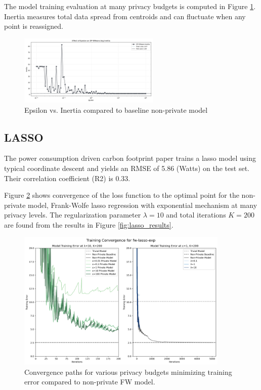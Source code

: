 \documentclass[12pt,letterpaper]{article}
\begin{document}
The model training evaluation at many privacy budgets is computed in Figure \ref{fig:epsilon_inertia}. Inertia measures total data spread from centroids and can fluctuate when any point is reassigned.

\begin{figure}[H]
    \centering
    \includegraphics[width=0.6\textwidth]{figure/dpk_plot.png}
    \caption{Epsilon vs. Inertia compared to baseline non-private model}
    \label{fig:epsilon_inertia}
\end{figure}

\subsection{LASSO}

The power consumption driven carbon footprint paper trains a lasso model using typical coordinate descent and yields an RMSE of 5.86 (Watts) on the test set. Their correlation coefficient (R2) is 0.33.

Figure \ref{fig:lasso_convergence} shows convergence of the loss function to the optimal point for the non-private model, Frank-Wolfe lasso regression with exponential mechanism at many privacy levels. The regularization parameter $\lambda=10$ and total iterations $K=200$ are found from the results in Figure \ref{fig:lasso_results}.  

\begin{figure}[H]
    \centering
    \includegraphics[width=0.9\textwidth]{figure/lasso_convergence.png}
    \caption{Convergence paths for various privacy budgets minimizing training error compared to non-private FW model.}
    \label{fig:lasso_convergence}
\end{figure}
\end{document}
